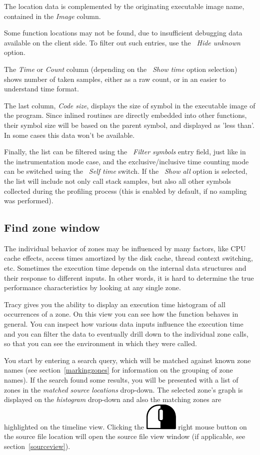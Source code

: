 \documentclass[hidelinks,titlepage,a4paper]{article}
\newcommand{\RMB}{\includegraphics[height=.8\baselineskip]{icons/rmb}}
\begin{document}
The location data is complemented by the originating executable image name, contained in the \emph{Image} column.

Some function locations may not be found, due to insufficient debugging data available on the client side. To filter out such entries, use the \emph{\faEyeSlash{}~Hide unknown} option.

The \emph{Time} or \emph{Count} column (depending on the \emph{\faStopwatch{}~Show time} option selection) shows number of taken samples, either as a raw count, or in an easier to understand time format.

The last column, \emph{Code size}, displays the size of symbol in the executable image of the program. Since inlined routines are directly embedded into other functions, their symbol size will be based on the parent symbol, and displayed as 'less than'. In some cases this data won't be available.

Finally, the list can be filtered using the \emph{\faFilter{}~Filter symbols} entry field, just like in the instrumentation mode case, and the exclusive/inclusive time counting mode can be switched using the \emph{\faClock{}~Self time} switch. If the \emph{\faPuzzlePiece{}~Show all} option is selected, the list will include not only call stack samples, but also all other symbols collected during the profiling process (this is enabled by default, if no sampling was performed).

\subsection{Find zone window}
\label{findzone}

The individual behavior of zones may be influenced by many factors, like CPU cache effects, access times amortized by the disk cache, thread context switching, etc. Sometimes the execution time depends on the internal data structures and their response to different inputs. In other words, it is hard to determine the true performance characteristics by looking at any single zone.

Tracy gives you the ability to display an execution time histogram of all occurrences of a zone. On this view you can see how the function behaves in general. You can inspect how various data inputs influence the execution time and you can filter the data to eventually drill down to the individual zone calls, so that you can see the environment in which they were called.

You start by entering a search query, which will be matched against known zone names (see section~\ref{markingzones} for information on the grouping of zone names). If the search found some results, you will be presented with a list of zones in the \emph{matched source locations} drop-down. The selected zone's graph is displayed on the \emph{histogram} drop-down and also the matching zones are highlighted on the timeline view. Clicking the \RMB{} right mouse button on the source file location will open the source file view window (if applicable, see section~\ref{sourceview}).
\end{document}
